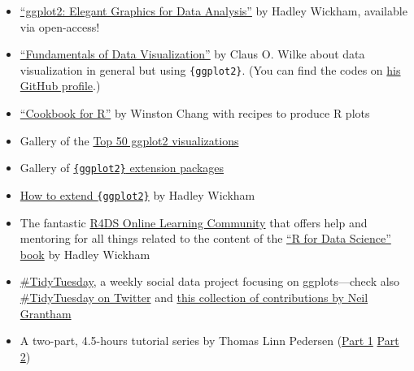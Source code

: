 \documentclass[
  letterpaper,
]{scrbook}
\providecommand{\tightlist}{%
  \setlength{\itemsep}{0pt}\setlength{\parskip}{0pt}}\usepackage{longtable,booktabs,array}
\begin{document}
\begin{itemize}
\tightlist
\item
  \href{https://ggplot2-book.org/}{``ggplot2: Elegant Graphics for Data
  Analysis''} by Hadley Wickham, available via open-access!
\item
  \href{http://serialmentor.com/dataviz/}{``Fundamentals of Data
  Visualization''} by Claus O. Wilke about data visualization in general
  but using \texttt{\{ggplot2\}}. (You can find the codes on
  \href{https://github.com/clauswilke/dataviz}{his GitHub profile}.)
\item
  \href{http://www.cookbook-r.com/Graphs/}{``Cookbook for R''} by
  Winston Chang with recipes to produce R plots
\item
  Gallery of the
  \href{http://r-statistics.co/Top50-Ggplot2-Visualizations-MasterList-R-Code.html}{Top
  50 ggplot2 visualizations}
\item
  Gallery of
  \href{https://exts.ggplot2.tidyverse.org/gallery/}{\texttt{\{ggplot2\}}
  extension packages}
\item
  \href{https://cran.r-project.org/web/packages/ggplot2/vignettes/extending-ggplot2.html}{How
  to extend \texttt{\{ggplot2\}}} by Hadley Wickham
\item
  The fantastic \href{https://www.rfordatasci.com/}{R4DS Online Learning
  Community} that offers help and mentoring for all things related to
  the content of the \href{r4ds.had.co.nz/}{``R for Data Science'' book}
  by Hadley Wickham
\item
  \href{https://github.com/rfordatascience/tidytuesday}{\#TidyTuesday},
  a weekly social data project focusing on ggplots---check also
  \href{https://twitter.com/hashtag/TidyTuesday?lang=en}{\#TidyTuesday
  on Twitter} and \href{https://nsgrantham.com/tidytuesdayrocks/}{this
  collection of contributions by Neil Grantham}
\item
  A two-part, 4.5-hours tutorial series by Thomas Linn Pedersen
  (\href{https://www.youtube.com/watch?v=h29g21z0a68}{Part 1} \textbar{}
  \href{https://www.youtube.com/watch?v=0m4yywqNPVY}{Part 2})
\end{itemize}


\backmatter
\end{document}
